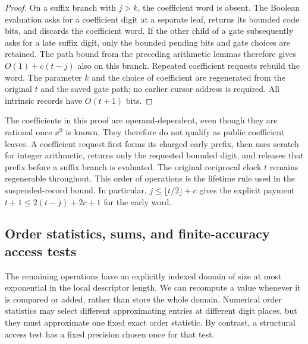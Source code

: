 \begin{proof}
On a suffix branch with $j>k$, the coefficient word is absent.
The Boolean evaluation asks for a coefficient digit at a separate
leaf, returns its bounded code bits, and discards the coefficient
word.  If the other child of a gate subsequently asks for a late
suffix digit, only the bounded pending bits and gate choices are
retained.  The path bound from the preceding arithmetic lemmas
therefore gives $O(1)+c(t-j)$ also on this branch.  Repeated
coefficient requests rebuild the word.  The parameter $k$ and the
choice of coefficient are regenerated from the original $t$ and
the saved gate path; no earlier cursor address is required.
All intrinsic records have $O(t+1)$ bits.
\end{proof}

The coefficients in this proof are operand-dependent, even though they
are rational once $x^0$ is known.  They therefore do not qualify as
public coefficient leaves.  A coefficient request first forms its
charged early prefix, then uses scratch for integer arithmetic, returns
only the requested bounded digit, and releases that prefix before a
suffix branch is evaluated.  The original reciprocal clock $t$ remains
regenerable throughout.  This order of operations is the lifetime rule
used in the suspended-record bound.  In particular, $j\le\lfloor t/2\rfloor+c$
gives the explicit payment $t+1\le2(t-j)+2c+1$ for the early word.

\subsection{Order statistics, sums, and finite-accuracy access tests}

The remaining operations have an explicitly indexed domain of size at most exponential in the local descriptor length. We can recompute a value whenever it is compared or added, rather than store the whole domain. Numerical order statistics may select different approximating entries at different digit places, but they must approximate one fixed exact order statistic. By contrast, a structural access test has a fixed precision chosen once for that test.


